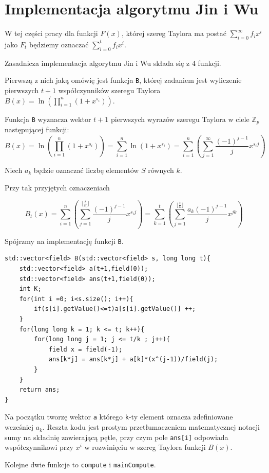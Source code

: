 \documentclass{article}
\begin{document}
\section{Implementacja algorytmu Jin i Wu}
W tej części pracy dla funkcji $F(x)$, której szereg Taylora ma postać $\sum_{i=0}^{\infty}f_ix^i$ jako $F_t$ będziemy
oznaczać $\sum_{i=0}^{t}f_ix^i$.

Zasadnicza implementacja algorytmu Jin i Wu składa się z $4$ funkcji. 

Pierwszą z nich jaką omówię jest funkcja \texttt{B}, której zadaniem jest wyliczenie pierwszych 
$t+1$ współczynników szeregu Taylora $B(x)=\ln(\prod_{i=1}^n(1+x^{s_i}))$.

Funkcja \texttt{B} wyznacza wektor $t+1$ pierwszych wyrazów szeregu Taylora w ciele $\mathbb{Z}_p$ następującej 
funkcji:
$$
B(x)=\ln(\prod_{i=1}^n(1+x^{s_i}))=\sum_{i=1}^n \ln(1+x^{s_i})=\sum_{i=1}^n(\sum_{j=1}^\infty
\frac{(-1)^{j-1}}{j}x^{s_i j})
$$

Niech $a_k$ będzie oznaczać liczbę elementów $S$ równych $k$.

Przy tak przyjętych oznaczeniach 

$$
B_t(x)=\sum_{i=1}^n (\sum_{j=1}^{\lfloor \frac{t}{s_i} \rfloor}\frac{(-1)^{j-1}}{j}x^{s_ij})
=\sum_{k=1}^t (\sum_{j=1}^{\lfloor \frac{t}{k} \rfloor}\frac{a_k(-1)^{j-1}}{j}x^{jk})$$

Spójrzmy na implementację funkcji \texttt{B}.

\begin{verbatim}
std::vector<field> B(std::vector<field> s, long long t){
    std::vector<field> a(t+1,field(0));
    std::vector<field> ans(t+1,field(0));
    int K;
    for(int i =0; i<s.size(); i++){
        if(s[i].getValue()<=t)a[s[i].getValue()] ++;
    }
    for(long long k = 1; k <= t; k++){
        for(long long j = 1; j <= t/k ; j++){
            field x = field(-1);
            ans[k*j] = ans[k*j] + a[k]*(x^(j-1))/field(j);
        }
    }
    return ans;
}
\end{verbatim}

Na początku tworzę wektor \texttt{a} którego \texttt{k}-ty element oznacza zdefiniowane wcześniej $a_k$. 
Reszta kodu jest prostym przetłumaczeniem matematycznej notacji sumy na składnię zawierającą pętle, przy 
czym pole \texttt{ans[i]} odpowiada współczynnikowi przy $x^i$ w rozwinięciu w szereg Taylora funkcji $B(x)$.

Kolejne dwie funkcje to \texttt{compute} i \texttt{mainCompute}. 
\end{document}
